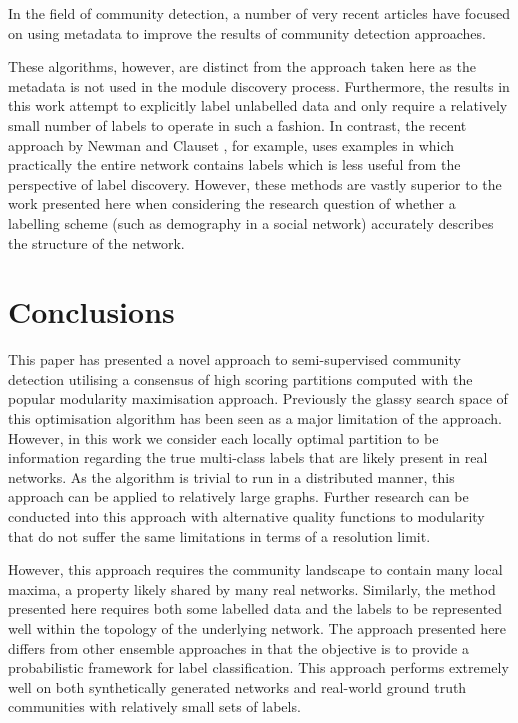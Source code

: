 \documentclass[a4paper,10pt]{article}
\begin{document}
In the field of community detection, a number of very recent articles have focused on using metadata to improve the results of community detection approaches.


These algorithms, however, are distinct from the approach taken here as the metadata is not used in the module discovery process.
Furthermore, the results in this work attempt to explicitly label unlabelled data and only require a relatively small number of labels to operate in such a fashion.
In contrast,  the recent approach by Newman and Clauset \cite{}, for example, uses examples in which practically the entire network contains labels which is less useful from the perspective of label discovery.
However, these methods are vastly superior to the work presented here when considering the research question of whether a labelling scheme (such as demography in a social network) accurately describes the structure of the network. 

\section{Conclusions}
This paper has presented a novel approach to semi-supervised community detection utilising a consensus of high scoring partitions computed with the popular modularity maximisation approach.
Previously the glassy search space of this optimisation algorithm has been seen as a major limitation of the approach.
However, in this work we consider each locally optimal partition to be information regarding the true multi-class labels that are likely present in real networks.
As the algorithm is trivial to run in a distributed manner, this approach can be applied to relatively large graphs.
Further research can be conducted into this approach with alternative quality functions to modularity that do not suffer the same limitations in terms of a resolution limit.

However, this approach requires the community landscape to contain many local maxima, a property likely shared by many real networks.
Similarly, the method presented here requires both some labelled data and the labels to be represented well within the topology of the underlying network.
The approach presented here differs from other ensemble approaches in that the objective is to provide a probabilistic framework for label classification.
This approach performs extremely well on both synthetically generated networks and real-world ground truth communities with relatively small sets of labels.
\end{document}
